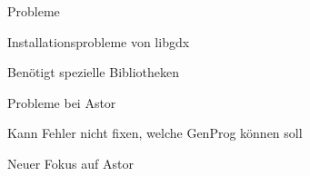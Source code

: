 %
\begin{frame}{Probleme}
	\begin{itemizes}{1em}
		\item Installationsprobleme von libgdx
		\begin{itemizes}{1em}
			\item Benötigt spezielle Bibliotheken
		\end{itemizes}
		\item Probleme bei Astor
		\begin{itemizes}{1em}
			\item Kann Fehler nicht fixen, welche GenProg können soll
		\end{itemizes}
		\item Neuer Fokus auf Astor
	\end{itemizes}
\end{frame}
%
%
%
%
%
%
%
%
%
%
%
%
%
%
%
%
%
%
%
%
